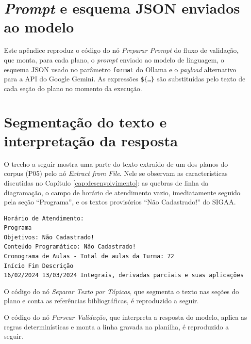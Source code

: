 \begin{apendicesenv}

\chapter{\textit{Prompt} e esquema JSON enviados ao modelo}
\label{ap:prompt}

Este apêndice reproduz o código do nó \textit{Preparar Prompt} do fluxo de validação, que monta, para cada plano, o \textit{prompt} enviado ao modelo de linguagem, o esquema JSON usado no parâmetro \texttt{format} do Ollama e o \textit{payload} alternativo para a API do Google Gemini. As expressões \texttt{\$\{\ldots\}} são substituídas pelo texto de cada seção do plano no momento da execução.



\chapter{Segmentação do texto e interpretação da resposta}
\label{ap:segmentacao}

O trecho a seguir mostra uma parte do texto extraído de um dos planos do corpus (P05) pelo nó \textit{Extract from File}. Nele se observam as características discutidas no Capítulo \ref{cap:desenvolvimento}: as quebras de linha da diagramação, o campo de horário de atendimento vazio, imediatamente seguido pela seção ``Programa'', e os textos provisórios ``Não Cadastrado!'' do SIGAA.

\begin{lstlisting}[numbers=none]
Horário de Atendimento:
Programa
Objetivos: Não Cadastrado!
Conteúdo Programático: Não Cadastrado!
Cronograma de Aulas - Total de aulas da Turma: 72
Início Fim Descrição
16/02/2024 13/03/2024 Integrais, derivadas parciais e suas aplicações
\end{lstlisting}

O código do nó \textit{Separar Texto por Tópicos}, que segmenta o texto nas seções do plano e conta as referências bibliográficas, é reproduzido a seguir.



O código do nó \textit{Parsear Validação}, que interpreta a resposta do modelo, aplica as regras determinísticas e monta a linha gravada na planilha, é reproduzido a seguir.




\end{apendicesenv}
